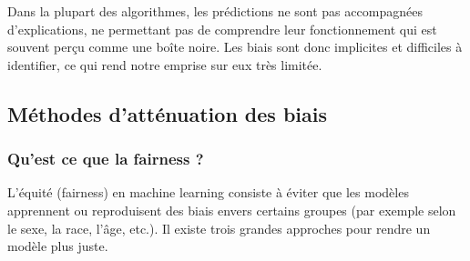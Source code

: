 \documentclass[12pt, letterpaper]{article}
\begin{document}
    Dans la plupart des algorithmes, les prédictions ne sont pas accompagnées d'explications, ne permettant pas de comprendre leur fonctionnement qui est souvent perçu comme une boîte noire.
    Les biais sont donc implicites et difficiles à identifier, ce qui rend notre emprise sur eux très limitée.

\subsection{Méthodes d'atténuation des biais}

\subsubsection*{Qu'est ce que la fairness ?}
L'équité (fairness) en machine learning consiste à éviter que les modèles apprennent ou reproduisent des biais envers certains groupes 
(par exemple selon le sexe, la race, l'âge, etc.). Il existe trois grandes approches pour rendre un modèle plus juste.
\end{document}
